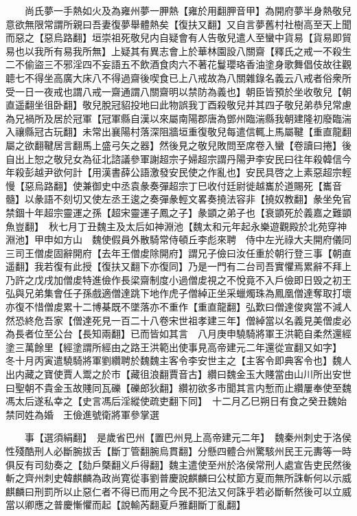 　　尚氏夢一手熱如火及為雍州夢一胛熱【雍於用翻胛音甲】為開府夢半身熱敬兒意欲無限常謂所親曰吾妻復夢舉體熱矣【復扶又翻】又自言夢舊村社樹高至天上聞而惡之【惡烏路翻】垣崇祖死敬兒内自疑會有人告敬兒遣人至蠻中貨易【貨易即貿易也以我所有易我所無】上疑其有異志會上於華林園設八關齋【釋氏之戒一不殺生二不偷盜三不邪淫四不妄語五不飲酒食肉六不著花鬘瓔珞香油塗身歌舞倡伎故往觀聼七不得坐高廣大床八不得過齋後喫食已上八戒故為八關雜錄名義云八戒者俗衆所受一日一夜戒也謂八戒一齋通謂八關齋明以禁防為義也】朝臣皆預於坐收敬兒【朝直遥翻坐徂卧翻】敬兒脫冠貂投地曰此物誤我丁酉殺敬兒并其四子敬兒弟恭兒常慮為兄禍所及居於冠軍【冠軍縣自漢以來屬南陽郡唐為鄧州臨湍縣我朝建隆初廢臨湍入禳縣冠古玩翻】未常出襄陽村落深阻牆垣重復敬兒每遣信輒上馬屬鞬【重直龍翻屬之欲翻鞬居言翻馬上盛弓矢之器】然後見之敬兒敗問至席卷入蠻【卷讀曰捲】後自出上恕之敬兒女為征北諮議參軍謝超宗子婦超宗謂丹陽尹李安民曰往年殺韓信今年殺彭越尹欲何計【用漢書薛公語激發安民使之作亂也】安民具啓之上素惡超宗輕慢【惡烏路翻】使兼御史中丞袁彖奏彈超宗丁巳收付廷尉徙越巂於道賜死【巂音髓】以彖語不刻切又使左丞王逡之奏彈彖輕文畧奏撓法容非【撓奴教翻】彖坐免官禁錮十年超宗靈運之孫【超宋靈運子鳳之子】彖顗之弟子也【衰顗死於義嘉之難顗魚豈翻】　秋七月丁丑魏主及太后如神淵池【魏太和元年起永樂遊觀殿於北苑穿神淵池】甲申如方山　魏使假員外散騎常侍頓丘李彪來聘　侍中左光祿大夫開府儀同三司王僧䖍固辭開府【去年王僧䖍除開府】謂兄子儉曰汝任重於朝行登三事【朝直遥翻】我若復有此授【復扶又翻下亦復同】乃是一門有二台司吾實懼焉累辭不拜上乃許之戊戌加僧䖍特進儉作長梁齋制度小過僧䖍視之不悅竟不入戶儉即日毁之初王弘與兄弟集會任子孫戲適僧達跳下地作虎子僧綽正坐采蠟燭珠為鳳凰僧達奪取打壞亦復不惜僧䖍累十二博棊既不墜落亦不重作【重直龍翻】弘歎曰僧達俊爽當不減人然恐終危吾家【僧達死見一百二十八卷宋世祖孝建三年】僧綽當以名義見美僧䖍必為長者位至公台【長知兩翻】已而皆如其言　八月庚申驍騎將軍王洪範自柔然還經塗三萬餘里【經塗謂所經由之路王洪範出使事見高帝建元二年還從宣翻又如字】　冬十月丙寅遣驍騎將軍劉纘聘於魏魏主客令李安世主之【主客令即典客令也】魏人出内藏之寶使賈人鬻之於市【藏徂浪翻賈音古】纘曰魏金玉大賤當由山川所出安世曰聖朝不貴金玉故賤同瓦礫【礫郎狄翻】纘初欲多市聞其言内慙而止纘屢奉使至魏馮太后遂私幸之【史言馮后淫縱使疏吏翻下同】　十二月乙巳朔日有食之癸丑魏始禁同姓為婚　王儉進號衛將軍參掌選

　　事【選須絹翻】　是歲省巴州【置巴州見上高帝建元二年】　魏秦州刺史于洛侯性殘酷刑人必斷腕拔舌【斷丁管翻腕烏貫翻】分懸四體合州驚駭州民王元夀等一時俱反有司劾奏之【劾戶槩翻义戶得翻】魏主遣使至州於洛侯常刑人處宣告吏民然後斬之齊州刺史韓麒麟為政尚寛從事劉普慶說麒麟曰公杖節方夏而無所誅斬何以示威麒麟曰刑罰所以止惡仁者不得已而用之今民不犯法又何誅乎若必斷斬然後可以立威當以卿應之普慶慚懼而起【說輸芮翻夏戶雅翻斷丁亂翻】

